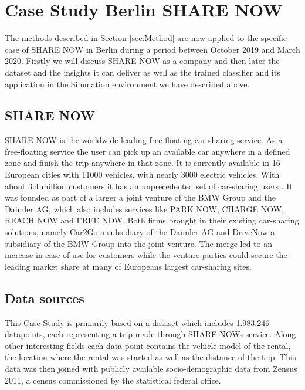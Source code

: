 \clearpage
\section{Case Study Berlin SHARE NOW}
\label{sec:CaseStudy}

The methods described in Section \ref{sec:Method} are now applied to the specific case
of SHARE NOW in Berlin during a period between October 2019 and March 2020. Firstly
we will discuss SHARE NOW as a company and then later the dataset and the insights it
can deliver as well as the trained classifier and its application in the Simulation
environment we have described above. 

\subsection{SHARE NOW}

SHARE NOW is the worldwide leading free-floating car-sharing service.
As a free-floating service the user can pick up an available car anywhere in a defined zone
and finish the trip anywhere in that zone. It is currently available in 16 European cities
with 11000 vehicles, with nearly 3000 electric vehicles. With about 3.4 million customers
it has an unprecedented set of car-sharing users \cite{ShareNowAboutUs}. It was founded as 
part of a larger a joint venture of the BMW Group and the Daimler AG, which also includes
services like PARK NOW, CHARGE NOW, REACH NOW and FREE NOW. Both firms brought in their
existing car-sharing solutions, namely Car2Go a subsidiary of the Daimler AG and DriveNow
a subsidiary of the BMW Group into the joint venture. The merge led to an increase in ease of use for customers
while the venture parties could secure the leading market share at many of Europeans
largest car-sharing sites.


\subsection{Data sources}
\label{sub_sec:CaseStudy/Data}

This Case Study is primarily based on a dataset which includes 1.983.246 datapoints, each 
representing a trip made through SHARE NOWs service. Along other interesting fields each data point
contains the vehicle model of the rental, the location where the rental was started as well as the distance of the trip.
This data was then joined with publicly available socio-demographic data from Zensus 2011, a census
commissioned by the statistical federal office. 


